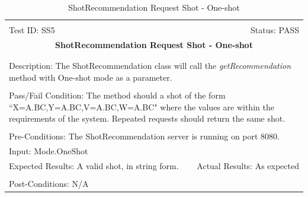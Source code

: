 \documentclass[11pt]{article}
\begin{document}
\begin{center}
\begin{table}[H]
\begin{tabular}{|l r|}\hline&\\[-2mm]
	Test ID: SS5	&Status: PASS\\[-3mm]
	\multicolumn{2}{|c|}{\textbf{\large{ShotRecommendation Request Shot - One-shot}}}\\&\\\hline&\\[-3mm]
	\multicolumn{2}{|p{\textwidth}|}{Description: The ShotRecommendation class will call the \textit{getRecommendation} method with One-shot mode as a parameter.}\\[1mm]\hline&\\[-3mm]
	\multicolumn{2}{|p{\textwidth}|}{Pass/Fail Condition: The method should a shot of the form ``X=A.BC,Y=A.BC,V=A.BC,W=A.BC" where the values are within the requirements of the system. Repeated requests should return the same shot.}\\[1mm]\hline&\\[-3mm]
	\multicolumn{2}{|p{\textwidth}|}{Pre-Conditions: The ShotRecommendation server is running on port 8080.}\\[4mm]
	\multicolumn{2}{|p{\textwidth}|}{Input: Mode.OneShot}\\[2mm]\hline
	\multicolumn{1}{|p{0.49\textwidth}}{Expected Results: A valid shot, in string form.}	&\multicolumn{1}{|p{0.45\textwidth}|}{Actual Results: As expected}\\\hline&\\[-3mm]
	\multicolumn{2}{|p{\textwidth}|}{Post-Conditions: N/A}\\\hline
\end{tabular}
\caption{ShotRecommendation Request Shot - One-shot}
\end{table}
\end{center}
\end{document}
